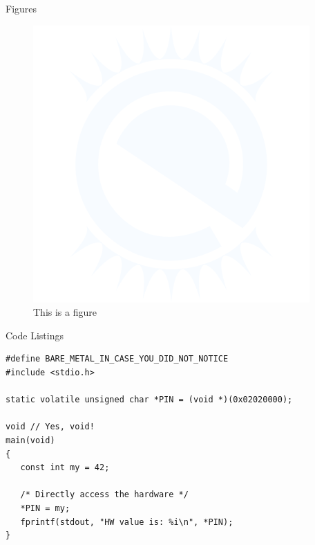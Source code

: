 \documentclass[aspectratio=169]{beamer}
\begin{document}
\begin{frame}{Figures}
   \begin{figure}[h!]\centering
      \includegraphics[scale=0.5]{img/theme/e_logo}
      \caption{This is a figure}
   \end{figure}
\end{frame}

\begin{frame}[fragile]{Code Listings}
   \begin{lstlisting}
#define BARE_METAL_IN_CASE_YOU_DID_NOT_NOTICE
#include <stdio.h>

static volatile unsigned char *PIN = (void *)(0x02020000);

void // Yes, void!
main(void)
{
   const int my = 42;

   /* Directly access the hardware */
   *PIN = my;
   fprintf(stdout, "HW value is: %i\n", *PIN);
}
   \end{lstlisting}
\end{frame}
\end{document}

